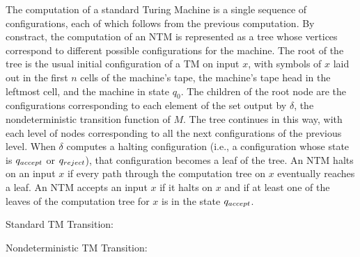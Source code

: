 The computation of a standard Turing Machine is a single sequence of
configurations, each of which follows from the previous computation.
By constract, the computation of an NTM is represented as a tree whose
vertices correspond to different possible configurations for the
machine.  The root of the tree is the usual initial configuration of a
TM on input $x$, with symbols of $x$ laid out in the first $n$ cells
of the machine's tape, the machine's tape head in the leftmost cell,
and the machine in state $q_0$.  The children of the root node are the
configurations corresponding to each element of the set output by
$\delta$, the nondeterministic transition function of $M$.  The tree
continues in this way, with each level of nodes corresponding to all
the next configurations of the previous level.  When $\delta$ computes
a halting configuration (i.e., a configuration whose state is
$q_{accept}$ or $q_{reject}$), that configuration becomes a leaf of the
tree.  An NTM halts on an input $x$ if every path through the
computation tree on $x$ eventually reaches a leaf.  An NTM accepts an
input $x$ if it halts on $x$ and if at least one of the
leaves of the computation tree for $x$ is in the state $q_{accept}$.\\

\bigskip
\begin{minipage}{0.5\linewidth}
  \begin{center}
    Standard TM Transition:
    \\

    \vspace{\baselineskip}

    \detercomptm{}
  \end{center}
\end{minipage}
\begin{minipage}{0.5\linewidth}
  \begin{center}
    Nondeterministic TM Transition: \\
    
    \vspace{\baselineskip}

    \scaletopagewidth{\ndetercomptm{}}
  \end{center}
\end{minipage}
 \label{fig:det-ndet}
\bigskip

